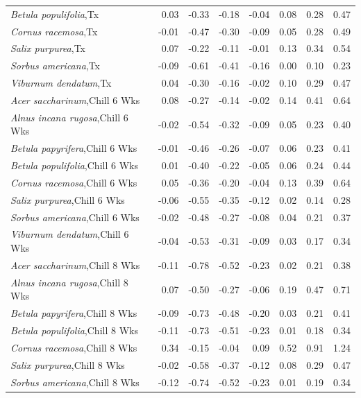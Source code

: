 \documentclass{article}\usepackage[]{graphicx}\usepackage[]{color}
\begin{document}
\begin{longtable}{lrrrrrrr}
  \textit{Betula populifolia},Tx & 0.03 & -0.33 & -0.18 & -0.04 & 0.08 & 0.28 & 0.47 \\ 
  \textit{Cornus racemosa},Tx & -0.01 & -0.47 & -0.30 & -0.09 & 0.05 & 0.28 & 0.49 \\ 
  \textit{Salix purpurea},Tx & 0.07 & -0.22 & -0.11 & -0.01 & 0.13 & 0.34 & 0.54 \\ 
  \textit{Sorbus americana},Tx & -0.09 & -0.61 & -0.41 & -0.16 & 0.00 & 0.10 & 0.23 \\ 
  \textit{Viburnum dendatum},Tx & 0.04 & -0.30 & -0.16 & -0.02 & 0.10 & 0.29 & 0.47 \\ 
  \textit{Acer saccharinum},Chill 6 Wks & 0.08 & -0.27 & -0.14 & -0.02 & 0.14 & 0.41 & 0.64 \\ 
  \textit{Alnus incana rugosa},Chill 6 Wks & -0.02 & -0.54 & -0.32 & -0.09 & 0.05 & 0.23 & 0.40 \\ 
  \textit{Betula papyrifera},Chill 6 Wks & -0.01 & -0.46 & -0.26 & -0.07 & 0.06 & 0.23 & 0.41 \\ 
  \textit{Betula populifolia},Chill 6 Wks & 0.01 & -0.40 & -0.22 & -0.05 & 0.06 & 0.24 & 0.44 \\ 
  \textit{Cornus racemosa},Chill 6 Wks & 0.05 & -0.36 & -0.20 & -0.04 & 0.13 & 0.39 & 0.64 \\ 
  \textit{Salix purpurea},Chill 6 Wks & -0.06 & -0.55 & -0.35 & -0.12 & 0.02 & 0.14 & 0.28 \\ 
  \textit{Sorbus americana},Chill 6 Wks & -0.02 & -0.48 & -0.27 & -0.08 & 0.04 & 0.21 & 0.37 \\ 
  \textit{Viburnum dendatum},Chill 6 Wks & -0.04 & -0.53 & -0.31 & -0.09 & 0.03 & 0.17 & 0.34 \\ 
  \textit{Acer saccharinum},Chill 8 Wks & -0.11 & -0.78 & -0.52 & -0.23 & 0.02 & 0.21 & 0.38 \\ 
  \textit{Alnus incana rugosa},Chill 8 Wks & 0.07 & -0.50 & -0.27 & -0.06 & 0.19 & 0.47 & 0.71 \\ 
  \textit{Betula papyrifera},Chill 8 Wks & -0.09 & -0.73 & -0.48 & -0.20 & 0.03 & 0.21 & 0.41 \\ 
  \textit{Betula populifolia},Chill 8 Wks & -0.11 & -0.73 & -0.51 & -0.23 & 0.01 & 0.18 & 0.34 \\ 
  \textit{Cornus racemosa},Chill 8 Wks & 0.34 & -0.15 & -0.04 & 0.09 & 0.52 & 0.91 & 1.24 \\ 
  \textit{Salix purpurea},Chill 8 Wks & -0.02 & -0.58 & -0.37 & -0.12 & 0.08 & 0.29 & 0.47 \\ 
  \textit{Sorbus americana},Chill 8 Wks & -0.12 & -0.74 & -0.52 & -0.23 & 0.01 & 0.19 & 0.34 \\ 

\end{longtable}
\end{document}
